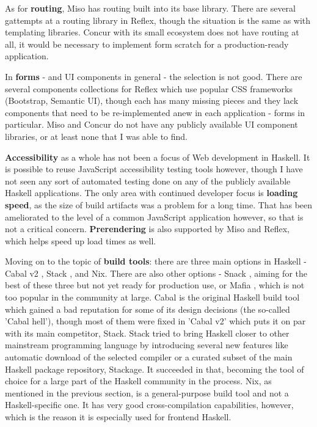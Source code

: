 \documentclass[english,odsaz]{fitthesis}
\begin{document}
As for \textbf{routing}, Miso has routing built into its base library. There are several
gattempts at a routing library in Reflex, though the situation is the same as
with templating libraries. Concur with its small ecosystem does not have routing
at all, it would be necessary to implement form scratch for a production-ready
application.

In \textbf{forms} - and UI components in general - the selection is not good. There
are several components collections for Reflex which use popular CSS frameworks
(Bootstrap, Semantic UI), though each has many missing pieces and they lack
components that need to be re-implemented anew in each application - forms in
particular. Miso and Concur do not have any publicly available UI component
libraries, or at least none that I was able to find.

\textbf{Accessibility} as a whole has not been a focus of Web development in Haskell. It
is possible to reuse JavaScript accessibility testing tools however, though I
have not seen any sort of automated testing done on any of the publicly
available Haskell applications. The only area with continued developer focus is
\textbf{loading speed}, as the size of build artifacts was a problem for a long
time. That has been ameliorated to the level of a common JavaScript application
however, so that is not a critical concern. \textbf{Prerendering} is also supported by
Miso and Reflex, which helps speed up load times as well.

Moving on to the topic of \textbf{build tools}: there are three main options in Haskell -
Cabal v2 \cite{cabal}, Stack \cite{stack}, and Nix. There are also other options -
Snack \cite{snack}, aiming for the best of these three but not yet ready for
production use, or Mafia \cite{mafia}, which is not too popular in the community
at large. Cabal is the original Haskell build tool which gained a bad reputation
for some of its design decisions (the so-called 'Cabal hell'), though most of
them were fixed in 'Cabal v2' which puts it on par with its main competitor,
Stack. Stack tried to bring Haskell closer to other mainstream programming
language by introducing several new features like automatic download of the
selected compiler or a curated subset of the main Haskell package repository,
Stackage. It succeeded in that, becoming the tool of choice for a large part of
the Haskell community in the process. Nix, as mentioned in the previous section,
is a general-purpose build tool and not a Haskell-specific one. It has very good
cross-compilation capabilities, however, which is the reason it is especially
used for frontend Haskell.
\end{document}

